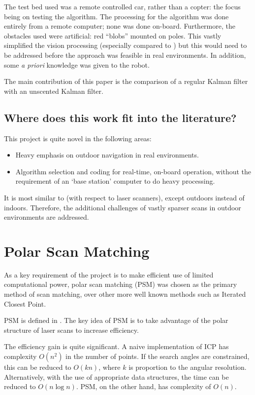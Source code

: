\documentclass[12pt,oneside,a4paper]{book}
\begin{document}
The test bed used was a remote controlled car, rather than a copter:
the focus being on testing the algorithm. The processing for the
algorithm was done entirely from a remote computer; none was done
on-board. Furthermore, the obstacles used were artificial: red
``blobs'' mounted on poles. This vastly simplified the vision
processing (especially compared to \cite{5152680}) but this would need
to be addressed before the approach was feasible in real
environments. In addition, some \emph{a priori}
knowledge was given to the robot.

The main contribution of this paper is the comparison of a regular
Kalman filter with an unscented Kalman filter. 
 
\subsection{Where does this work fit into the literature?}
\label{sec:where-does-this}

This project is quite novel in the following areas:
\begin{itemize}
\item Heavy emphasis on outdoor navigation in real environments.
\item Algorithm selection and coding for real-time, on-board
  operation, without the requirement of an `base station' computer to
  do heavy processing.
\end{itemize}

It is most similar to \cite{achtelik2009stereo} (with respect to laser
scanners), except outdoors instead of indoors. Therefore, the
additional challenges of vastly sparser scans in outdoor environments
are addressed.

\section{Polar Scan Matching}
\label{sec:polar-scan-matching}

As a key requirement of the project is to make efficient use of
limited computational power, polar scan matching (PSM) was chosen as the
primary method of scan matching, over other more well known methods
such as Iterated Closest Point.

PSM is defined in \cite{polarscanmatching}. The key idea of PSM is to
take advantage of the polar structure of laser scans to increase
efficiency. 

The efficiency gain is quite significant. A naive implementation of
ICP has complexity $O(n^2)$ in the number of points. If the search
angles are constrained, this can be reduced to $O(kn)$, where $k$ is
proportion to the angular resolution. Alternatively, with the
use of appropriate data structures, the time can be reduced to
$O(n\log n)$. PSM, on the other hand, has complexity of $O(n)$.
\end{document}
